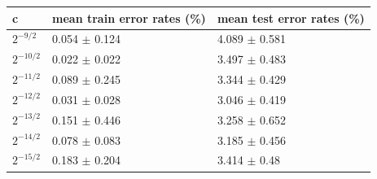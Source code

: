 \begin{tabular}{lll}
\toprule
c & mean train error rates (\%) & mean test error rates (\%) \\
\midrule
$2^{-9/2}$ & 0.054 $\pm$ 0.124 & 4.089 $\pm$ 0.581 \\
$2^{-10/2}$ & 0.022 $\pm$ 0.022 & 3.497 $\pm$ 0.483 \\
$2^{-11/2}$ & 0.089 $\pm$ 0.245 & 3.344 $\pm$ 0.429 \\
$2^{-12/2}$ & 0.031 $\pm$ 0.028 & 3.046 $\pm$ 0.419 \\
$2^{-13/2}$ & 0.151 $\pm$ 0.446 & 3.258 $\pm$ 0.652 \\
$2^{-14/2}$ & 0.078 $\pm$ 0.083 & 3.185 $\pm$ 0.456 \\
$2^{-15/2}$ & 0.183 $\pm$ 0.204 & 3.414 $\pm$ 0.48 \\
\bottomrule
\end{tabular}
